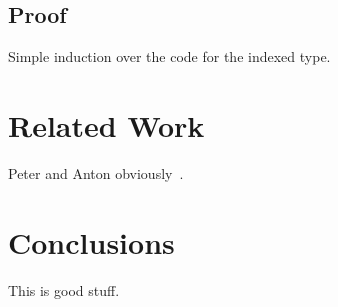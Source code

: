 \documentclass[11pt]{article}
\begin{document}
\subsection{Proof}

Simple induction over the code for the indexed type.

\section{Related Work}

Peter and Anton obviously~\cite{dybjer:indexed-ir}.

\section{Conclusions}

This is good stuff.



\end{document}
